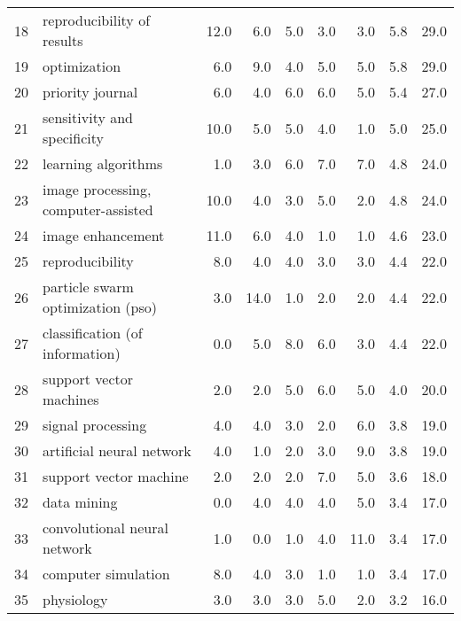 \begin{tabular}{llrrrrrrr}
18 &               reproducibility of results &  12.0 &   6.0 &   5.0 &   3.0 &   3.0 &   5.8 &   29.0 \\
19 &                             optimization &   6.0 &   9.0 &   4.0 &   5.0 &   5.0 &   5.8 &   29.0 \\
20 &                         priority journal &   6.0 &   4.0 &   6.0 &   6.0 &   5.0 &   5.4 &   27.0 \\
21 &              sensitivity and specificity &  10.0 &   5.0 &   5.0 &   4.0 &   1.0 &   5.0 &   25.0 \\
22 &                      learning algorithms &   1.0 &   3.0 &   6.0 &   7.0 &   7.0 &   4.8 &   24.0 \\
23 &      image processing, computer-assisted &  10.0 &   4.0 &   3.0 &   5.0 &   2.0 &   4.8 &   24.0 \\
24 &                        image enhancement &  11.0 &   6.0 &   4.0 &   1.0 &   1.0 &   4.6 &   23.0 \\
25 &                          reproducibility &   8.0 &   4.0 &   4.0 &   3.0 &   3.0 &   4.4 &   22.0 \\
26 &        particle swarm optimization (pso) &   3.0 &  14.0 &   1.0 &   2.0 &   2.0 &   4.4 &   22.0 \\
27 &          classification (of information) &   0.0 &   5.0 &   8.0 &   6.0 &   3.0 &   4.4 &   22.0 \\
28 &                  support vector machines &   2.0 &   2.0 &   5.0 &   6.0 &   5.0 &   4.0 &   20.0 \\
29 &                        signal processing &   4.0 &   4.0 &   3.0 &   2.0 &   6.0 &   3.8 &   19.0 \\
30 &                artificial neural network &   4.0 &   1.0 &   2.0 &   3.0 &   9.0 &   3.8 &   19.0 \\
31 &                   support vector machine &   2.0 &   2.0 &   2.0 &   7.0 &   5.0 &   3.6 &   18.0 \\
32 &                              data mining &   0.0 &   4.0 &   4.0 &   4.0 &   5.0 &   3.4 &   17.0 \\
33 &             convolutional neural network &   1.0 &   0.0 &   1.0 &   4.0 &  11.0 &   3.4 &   17.0 \\
34 &                      computer simulation &   8.0 &   4.0 &   3.0 &   1.0 &   1.0 &   3.4 &   17.0 \\
35 &                               physiology &   3.0 &   3.0 &   3.0 &   5.0 &   2.0 &   3.2 &   16.0 \\

\end{tabular}
